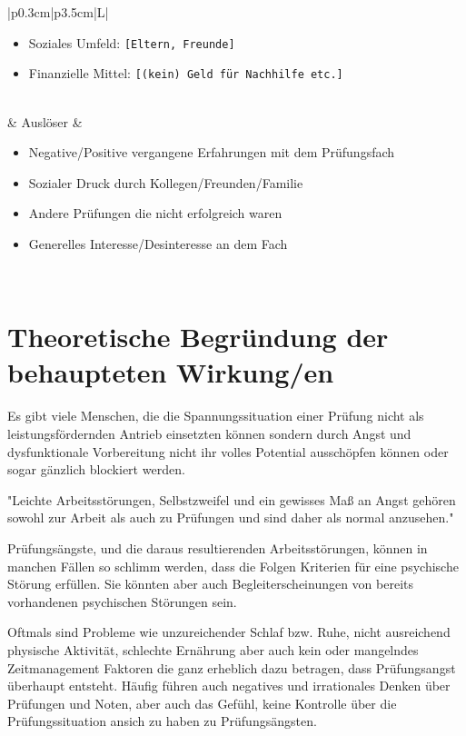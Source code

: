 \documentclass[11pt, a4paper]{article}
\begin{document}
\begin{table}[h!]
\begin{tabularx}{\textwidth}{|p{0.3cm}|p{3.5cm}|L|}
\begin{itemize}[noitemsep, topsep=0pt]
			\item Soziales Umfeld: \texttt{[Eltern, Freunde]}
			\item Finanzielle Mittel: \texttt{[(kein) Geld für Nachhilfe etc.]}
		\end{itemize} \\
		 & Auslöser                               & 
		\begin{itemize}[noitemsep, topsep=0pt]
			\item Negative/Positive vergangene Erfahrungen mit dem Prüfungsfach
			\item Sozialer Druck durch Kollegen/Freunden/Familie
			\item Andere Prüfungen die nicht erfolgreich waren
			\item Generelles Interesse/Desinteresse an dem Fach
		\end{itemize} \\
		\hline
	\end{tabularx}
\end{table}
\newpage
\section*{Theoretische Begründung der behaupteten Wirkung/en}
Es gibt viele Menschen, die die Spannungssituation einer Prüfung nicht als leistungsfördernden Antrieb einsetzten können sondern durch Angst und dysfunktionale Vorbereitung nicht ihr volles Potential ausschöpfen können oder sogar gänzlich blockiert werden. \cite{Holm-Hadulla2009}

"Leichte Arbeitsstörungen, Selbstzweifel und ein gewisses Maß an Angst gehören sowohl zur Arbeit als auch zu Prüfungen und sind daher als normal anzusehen." \cite{Holm-Hadulla2009}

Prüfungsängste, und die daraus resultierenden Arbeitsstörungen, können in manchen Fällen so schlimm werden, dass die Folgen Kriterien für eine psychische Störung erfüllen. Sie könnten aber auch Begleiterscheinungen von bereits vorhandenen psychischen Störungen sein. \cite{Holm-Hadulla2009}

Oftmals sind Probleme wie unzureichender Schlaf bzw. Ruhe, nicht ausreichend physische Aktivität, schlechte Ernährung aber auch kein oder mangelndes Zeitmanagement Faktoren die ganz erheblich dazu betragen, dass Prüfungsangst überhaupt entsteht. Häufig führen auch negatives und irrationales Denken über Prüfungen und Noten, aber auch das Gefühl, keine Kontrolle über die Prüfungssituation ansich zu haben zu Prüfungsängsten. \cite{hashmat2008factors}
\end{document}
